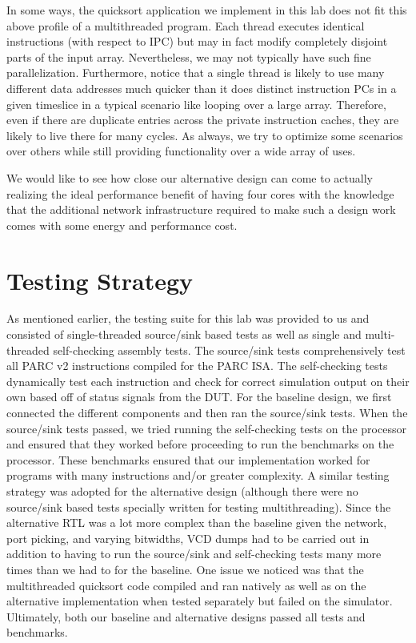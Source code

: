 \documentclass[10pt]{article}
\begin{document}
In some ways, the quicksort application we implement in this lab does not fit this above profile of a multithreaded program. Each thread executes identical instructions (with respect to IPC) but may in fact modify completely disjoint parts of the input array. Nevertheless, we may not typically have such fine parallelization. Furthermore, notice that a single thread is likely to use many different data addresses much quicker than it does distinct instruction PCs in a given timeslice in a typical scenario like looping over a large array. Therefore, even if there are duplicate entries across the private instruction caches, they are likely to live there for many cycles. As always, we try to optimize some scenarios over others while still providing functionality over a wide array of uses.

We would like to see how close our alternative design can come to actually realizing the ideal performance benefit of having four cores with the knowledge that the additional network infrastructure required to make such a design work comes with some energy and performance cost.


\section{Testing Strategy}

As mentioned earlier, the testing suite for this lab was provided to us and consisted of single-threaded source/sink based tests as well as single and multi-threaded self-checking assembly tests. The source/sink tests comprehensively test all PARC v2 instructions compiled for the PARC ISA. The self-checking tests dynamically test each instruction and check for correct simulation output on their own based off of status signals from the DUT. For the baseline design, we first connected the different components and then ran the source/sink tests. When the source/sink tests passed, we tried running the self-checking tests on the processor and ensured that they worked before proceeding to run the benchmarks on the processor. These benchmarks ensured that our implementation worked for programs with many instructions and/or greater complexity. A similar testing strategy was adopted for the alternative design (although there were no source/sink based tests specially written for testing multithreading). Since the alternative RTL was a lot more complex than the baseline given the network, port picking, and varying bitwidths, VCD dumps had to be carried out in addition to having to run the source/sink and self-checking tests many more times than we had to for the baseline. One issue we noticed was that the multithreaded quicksort code compiled and ran natively as well as on the alternative implementation when tested separately but failed on the simulator. Ultimately, both our baseline and alternative designs passed all tests and benchmarks. 
\end{document}
